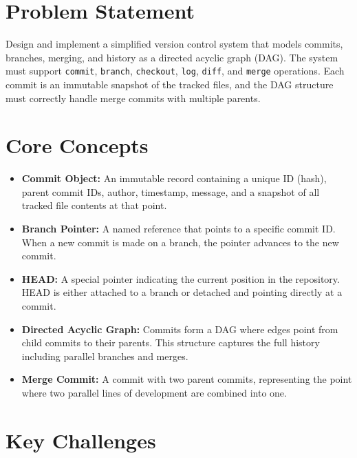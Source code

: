 \section{Problem Statement}

Design and implement a simplified version control system that models commits, branches, merging, and history as a directed acyclic graph (DAG). The system must support \texttt{commit}, \texttt{branch}, \texttt{checkout}, \texttt{log}, \texttt{diff}, and \texttt{merge} operations. Each commit is an immutable snapshot of the tracked files, and the DAG structure must correctly handle merge commits with multiple parents.

\section{Core Concepts}

\begin{itemize}
  \item \textbf{Commit Object:} An immutable record containing a unique ID (hash), parent commit IDs, author, timestamp, message, and a snapshot of all tracked file contents at that point.
  \item \textbf{Branch Pointer:} A named reference that points to a specific commit ID. When a new commit is made on a branch, the pointer advances to the new commit.
  \item \textbf{HEAD:} A special pointer indicating the current position in the repository. HEAD is either attached to a branch or detached and pointing directly at a commit.
  \item \textbf{Directed Acyclic Graph:} Commits form a DAG where edges point from child commits to their parents. This structure captures the full history including parallel branches and merges.
  \item \textbf{Merge Commit:} A commit with two parent commits, representing the point where two parallel lines of development are combined into one.
\end{itemize}

\section{Key Challenges}


